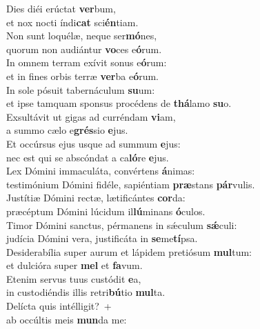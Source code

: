 \evenverse Dies diéi erúctat \textbf{ver}bum,~\*\\
\evenverse et nox nocti índi\textbf{cat} sci\textbf{én}tiam.\\
\oddverse Non sunt loquélæ, neque ser\textbf{mó}nes,~\*\\
\oddverse quorum non audiántur \textbf{vo}ces e\textbf{ó}rum.\\
\evenverse In omnem terram exívit sonus e\textbf{ó}rum:~\*\\
\evenverse et in fines orbis terræ \textbf{ver}ba e\textbf{ó}rum.\\
\oddverse In sole pósuit tabernáculum \textbf{su}um:~\*\\
\oddverse et ipse tamquam sponsus procédens de \textbf{thá}lamo \textbf{su}o.\\
\evenverse Exsultávit ut gigas ad curréndam \textbf{vi}am,~\*\\
\evenverse a summo cælo e\textbf{grés}sio \textbf{e}jus.\\
\oddverse Et occúrsus ejus usque ad summum \textbf{e}jus:~\*\\
\oddverse nec est qui se abscóndat a ca\textbf{ló}re \textbf{e}jus.\\
\evenverse Lex Dómini immaculáta, convértens \textbf{á}nimas:~\*\\
\evenverse testimónium Dómini fidéle, sapiéntiam \textbf{præ}stans \textbf{pár}vulis.\\
\oddverse Justítiæ Dómini rectæ, lætificántes \textbf{cor}da:~\*\\
\oddverse præcéptum Dómini lúcidum il\textbf{lú}minans \textbf{ó}culos.\\
\evenverse Timor Dómini sanctus, pérmanens in sǽculum \textbf{sǽ}culi:~\*\\
\evenverse judícia Dómini vera, justificáta in \textbf{se}me\textbf{tí}psa.\\
\oddverse Desiderabília super aurum et lápidem pretiósum \textbf{mul}tum:~\*\\
\oddverse et dulcióra super \textbf{mel} et \textbf{fa}vum.\\
\evenverse Etenim servus tuus custódit \textbf{e}a,~\*\\
\evenverse in custodiéndis illis retri\textbf{bú}tio \textbf{mul}ta.\\
\oddverse Delícta quis intélligit?~+\\
\oddverse  ab occúltis meis \textbf{mun}da me:~\*\\
